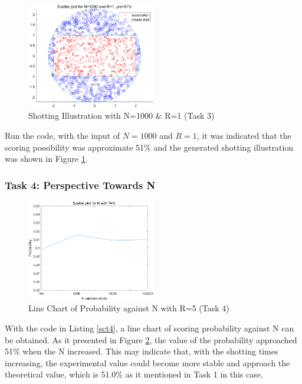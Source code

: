 \documentclass[11pt, a4paper]{article}
\begin{document}
\begin{figure}[htbp]     \begin{centering}
    \includegraphics[width=0.5\textwidth]{img/t3.png}
    \caption{Shotting Illustration with N=1000 \& R=1 (Task 3)}
    \label{Fig:task3}
    \end{centering}
\end{figure}


Run the code, with the input of $N=1000$ and $R=1$, it was indicated that the scoring possibility was approximate 51\% and the generated shotting illustration was shown in Figure \ref{Fig:task3}.

\subsubsection{Task 4: Perspective Towards N}

\begin{figure}[htbp]     \begin{centering}
    \includegraphics[width=0.5\textwidth]{img/t4.png}
    \caption{Line Chart of Probability against N with R=5 (Task 4)}
    \label{Fig:task4}
    \end{centering}
\end{figure}

With the code in Listing \ref{sct4}, a line chart of scoring probability against N can be obtained. As it presented in Figure \ref{Fig:task4}, the value of the probability approached 51\% when the N increased. This may indicate that, with the shotting times increasing, the experimental value could become more stable and approach the theoretical value, which is 51.0\% as it mentioned in Task 1 in this case.
\end{document}
